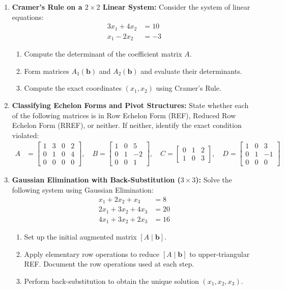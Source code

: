 \begin{enumerate}
    \item \textbf{Cramer's Rule on a $2 \times 2$ Linear System:}
    Consider the system of linear equations:
    \begin{align*}
    3x_1 + 4x_2 &= 10 \\
    x_1 - 2x_2 &= -3
    \end{align*}
    \begin{enumerate}
        \item Compute the determinant of the coefficient matrix $A$.
        \item Form matrices $A_1(\mathbf{b})$ and $A_2(\mathbf{b})$ and evaluate their determinants.
        \item Compute the exact coordinates $(x_1, x_2)$ using Cramer's Rule.
    \end{enumerate}

    \item \textbf{Classifying Echelon Forms and Pivot Structures:}
    State whether each of the following matrices is in Row Echelon Form (REF), Reduced Row Echelon Form (RREF), or neither. If neither, identify the exact condition violated:
    \begin{align*}
    A &= \begin{bmatrix} 1 & 3 & 0 & 2 \\ 0 & 1 & 0 & 4 \\ 0 & 0 & 0 & 0 \end{bmatrix}, \quad
    B = \begin{bmatrix} 1 & 0 & 5 \\ 0 & 1 & -2 \\ 0 & 0 & 1 \end{bmatrix}, \quad
    C = \begin{bmatrix} 0 & 1 & 2 \\ 1 & 0 & 3 \end{bmatrix}, \quad
    D = \begin{bmatrix} 1 & 0 & 3 \\ 0 & 1 & -1 \\ 0 & 0 & 0 \end{bmatrix}
    \end{align*}

    \item \textbf{Gaussian Elimination with Back-Substitution ($3 \times 3$):}
    Solve the following system using Gaussian Elimination:
    \begin{align*}
    x_1 + 2x_2 + x_3 &= 8 \\
    2x_1 + 3x_2 + 4x_3 &= 20 \\
    4x_1 + 3x_2 + 2x_3 &= 16
    \end{align*}
    \begin{enumerate}
        \item Set up the initial augmented matrix $[A \mid \mathbf{b}]$.
        \item Apply elementary row operations to reduce $[A \mid \mathbf{b}]$ to upper-triangular REF. Document the row operations used at each step.
        \item Perform back-substitution to obtain the unique solution $(x_1, x_2, x_3)$.
    \end{enumerate}


\end{enumerate}
